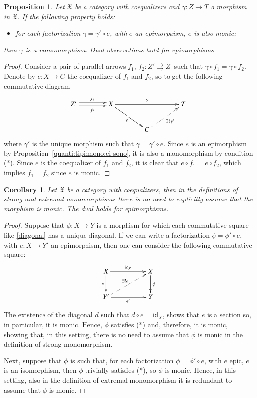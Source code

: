 \documentclass[12pt]{article}
\newtheorem{proposition}[lemma]{Proposition}
\newtheorem{corollary}[lemma]{Corollary}
\theoremstyle{definition}
\def\X{\mathfrak X}
\numberwithin{equation}{section}
\newcommand{\id}[1]{\mathsf{id}_{#1}}
\begin{document}
\begin{proposition}
Let $\X$ be a category with coequalizers and $\gamma\colon Z\to T$ a morphism in $\X$. If the following property holds: 
\begin{itemize}
\item[(*)] for each factorization ${\gamma = \gamma' \circ  e}$, with $e$ an epimorphism, $e$ is also monic;
\end{itemize}
then $\gamma$ is a monomorphism.  Dual observations hold for epimorphisms
\end{proposition}
\begin{proof}
Consider a pair of parallel arrows $f_1,\,f_2\colon Z'\rightrightarrows Z$, such that $\gamma\circ f_1=\gamma\circ f_2$. Denote by $e\colon X\to C$ the coequalizer of $f_1$ and $f_2$, so to get the following commutative diagram
\[
\xymatrix@C=40pt{
	Z'\ar@<-.5ex>[r]_-{f_2} \ar@<.5ex>[r]^-{f_1}&X\ar[dr]_{e}\ar[rr]^-\gamma&&T\\
	&&C\ar@{.>}[ur]_-{\exists!\, \gamma'}
}
\]
where $\gamma'$ is the unique morphism such that $\gamma=\gamma'\circ e$. Since $e$ is an epimorphism by Proposition~\ref{quanti:tipi:mono:ci sono}, it is also a monomorphism by condition (*). Since $e$ is the coequalizer of $f_1$ and $f_2$, it is clear that $e\circ f_1=e\circ f_2$, which implies $f_1=f_2$ since $e$ is monic.
\end{proof}

\begin{corollary}\label{ext_mono_implies_mono_coro}
	Let $\X$ be a category with coequalizers, then  in the definitions of strong and extremal monomorphisms there is no need to explicitly assume that the morphism is monic. The dual holds for epimorphisms.
\end{corollary}
\begin{proof}
Suppose that $\phi\colon X\to Y$ is a morphism for which each commutative square like \eqref{diagonal} has a unique diagonal. If we can write a factorization $\phi=\phi'\circ e$, with $e\colon X\to Y'$ an epimorphism, then one can consider the following commutative square:
\[
\xymatrix@C=50pt{
	X\ar[d]_-{e}\ar@{>}^{\id{X}}[r]&X\ar[d]^{\phi}\\
	Y'\ar@{.>}[ur]^{\exists!d}\ar[r]_{\phi'}&Y}
\]
The existence of the diagonal $d$ such that $d\circ e=\id X$, shows that $e$ is a section so, in particular, it is monic. Hence, $\phi$ satisfies (*) and, therefore, it is monic, showing that, in this setting, there is no need to assume that $\phi$ is monic in the definition of strong monomorphism.

Next, suppose that $\phi$ is such that, for each factorization ${\phi = \phi' \circ  e}$, with $e$ epic, $e$ is an isomorphism, then $\phi$ trivially satisfies (*), so $\phi$ is monic. Hence, in this setting, also in the definition of extremal monomorphism it is redundant to assume that $\phi$ is monic.
\end{proof}
    
\end{document}
